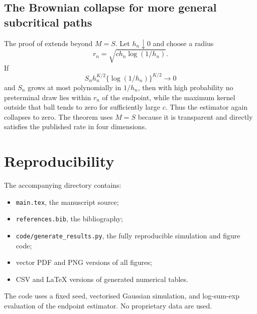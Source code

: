 \documentclass[11pt]{article}
\theoremstyle{definition}
\begin{document}
\subsection{The Brownian collapse for more general subcritical paths}

The proof of  extends beyond $M=S$. Let $h_n\downarrow0$ and choose a radius
\[
r_n=\sqrt{c h_n\log(1/h_n)}.
\]
If
\[
S_n h_n^{K/2}\{\log(1/h_n)\}^{K/2}\to0
\]
and $S_n$ grows at most polynomially in $1/h_n$, then with high probability no preterminal draw lies within $r_n$ of the endpoint, while the maximum kernel outside that ball tends to zero for sufficiently large $c$. Thus the estimator again collapses to zero. The theorem uses $M=S$ because it is transparent and directly satisfies the published rate in four dimensions.

\section{Reproducibility}\label{app:repro}

The accompanying directory contains:
\begin{itemize}
\item \texttt{main.tex}, the manuscript source;
\item \texttt{references.bib}, the bibliography;
\item \texttt{code/generate\_results.py}, the fully reproducible simulation and figure code;
\item vector PDF and PNG versions of all figures;
\item CSV and LaTeX versions of generated numerical tables.
\end{itemize}
The code uses a fixed seed, vectorised Gaussian simulation, and log-sum-exp evaluation of the endpoint estimator. No proprietary data are used.

\printbibliography
\end{document}
